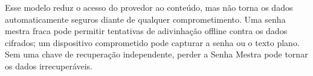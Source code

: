 Esse modelo reduz o acesso do provedor ao conteúdo, mas não torna os dados automaticamente seguros diante de qualquer comprometimento. Uma senha mestra fraca pode permitir tentativas de adivinhação offline contra os dados cifrados; um dispositivo comprometido pode capturar a senha ou o texto plano. Sem uma chave de recuperação independente, perder a Senha Mestra pode tornar os dados irrecuperáveis.

\pagebreak
